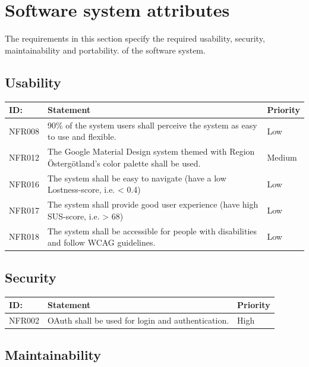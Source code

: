 \documentclass{scrreprt}
\begin{document}
\section{Software system attributes}
The requirements in this section specify the required usability, security, maintainability and portability.
of the software system.

\subsection{Usability}

\begin{center}
\begin{tabularx}{\linewidth}{| l | X | l |}
\hline
\textbf{ID:} & \textbf{Statement} & \textbf{Priority} \\
\hline
NFR008 & 
90\% of the system users shall perceive the system as easy to use and flexible. & 
Low \\ 
\hline
NFR012 & 
The Google Material Design system themed with Region Östergötland’s color palette shall be used. & 
Medium \\ 
\hline
NFR016 & 
The system shall be easy to navigate (have a low Lostness-score, i.e. < 0.4) &
Low \\ 
\hline
NFR017 & 
The system shall provide good user experience (have high SUS-score, i.e. > 68) & 
Low \\ 
\hline
NFR018 & 
The system shall be accessible for people with disabilities and follow WCAG guidelines. &
Low \\ 
\hline
\end{tabularx}
\end{center}

\subsection{Security}

\begin{center}
\begin{tabularx}{\linewidth}{| l | X | l |}
\hline
\textbf{ID:} & \textbf{Statement} & \textbf{Priority} \\
\hline
NFR002 & 
OAuth shall be used for login and authentication. &
High \\ 
 \hline
\end{tabularx}
\end{center}

\subsection{Maintainability}
\end{document}
